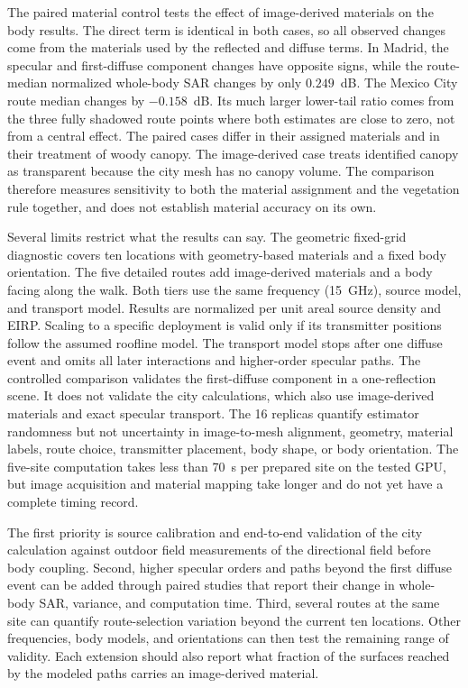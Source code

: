\documentclass{ieeeaccess}
\begin{document}
The paired material control tests the effect of image-derived materials on the
body results. The direct term is identical in both cases, so all observed
changes come from the materials used by the reflected and diffuse terms. In
Madrid, the specular and first-diffuse component changes have opposite signs,
while the route-median normalized whole-body SAR changes by only $0.249$~dB.
The Mexico City route median changes by $-0.158$~dB. Its much larger lower-tail
ratio comes from the three fully shadowed route points where both estimates are
close to zero, not from a central effect. The paired cases differ in their
assigned materials and in their treatment of woody canopy. The image-derived
case treats identified canopy as transparent because the city mesh has no canopy
volume. The comparison therefore measures sensitivity to both the material
assignment and the vegetation rule together, and does not establish material
accuracy on its own.

Several limits restrict what the results can say. The geometric fixed-grid
diagnostic covers ten locations with geometry-based materials and a fixed body
orientation. The five detailed routes add image-derived materials and a body
facing along the walk. Both tiers use the same frequency (15~GHz), source model,
and transport model. Results are normalized per unit areal source density and
EIRP. Scaling to a specific deployment is valid only if its transmitter
positions follow the assumed roofline model. The transport model stops after one
diffuse event and omits all later interactions and higher-order specular paths.
The controlled comparison validates the first-diffuse component in a
one-reflection scene. It does not validate the city calculations, which also
use image-derived materials and exact specular transport. The 16 replicas
quantify estimator randomness but not uncertainty in image-to-mesh alignment,
geometry, material labels, route choice, transmitter placement, body shape, or
body orientation. The five-site computation takes less than 70~s per prepared
site on the tested GPU, but image acquisition and material mapping take longer
and do not yet have a complete timing record.

The first priority is source calibration and end-to-end validation of the city
calculation against outdoor field measurements of the directional field before
body coupling. Second, higher specular orders and paths beyond the first diffuse
event can be added through paired studies that report their change in whole-body
SAR, variance, and computation time. Third, several routes at the same site can
quantify route-selection variation beyond the current ten locations. Other
frequencies, body models, and orientations can then test the remaining range of
validity. Each extension should also report what fraction of the surfaces
reached by the modeled paths carries an image-derived material.
\end{document}
